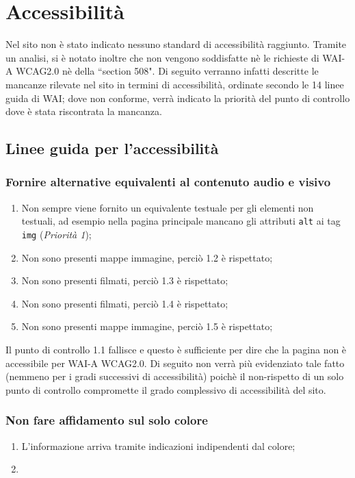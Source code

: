 \section{Accessibilità}\label{sec:accessibilita}
Nel sito non è stato indicato nessuno standard di accessibilità raggiunto.
Tramite un analisi, si è notato inoltre che non vengono soddisfatte nè le
richieste di WAI-A WCAG2.0 nè della ``section 508".
Di seguito verranno infatti descritte le mancanze rilevate nel sito in termini
di accessibilità, ordinate secondo le 14 linee guida di WAI; dove non conforme,
verrà indicato la priorità del punto di controllo dove è stata riscontrata la
mancanza.

\subsection{Linee guida per l'accessibilità}

\subsubsection{Fornire alternative equivalenti al contenuto audio e visivo}
\begin{enumerate}
\item Non sempre viene fornito un equivalente testuale per gli elementi non
testuali, ad esempio nella pagina principale mancano gli attributi \texttt{alt}
ai tag \texttt{img}
(\textit{Priorità 1});
\item Non sono presenti mappe immagine, perciò 1.2 è rispettato;
\item Non sono presenti filmati, perciò 1.3 è rispettato;
\item Non sono presenti filmati, perciò 1.4 è rispettato;
\item Non sono presenti mappe immagine, perciò 1.5 è rispettato;
\end{enumerate}

Il punto di controllo 1.1 fallisce e questo è sufficiente per dire che la
pagina non è accessibile per WAI-A WCAG2.0. Di seguito non verrà più
evidenziato tale fatto (nemmeno per i gradi successivi di accessibilità) poichè
il non-rispetto di un solo punto di controllo compromette il grado complessivo
di accessibilità del sito.

\subsubsection{Non fare affidamento sul solo colore}
\begin{enumerate}
\item L'informazione arriva tramite indicazioni indipendenti dal colore;
\item %
\end{enumerate}

